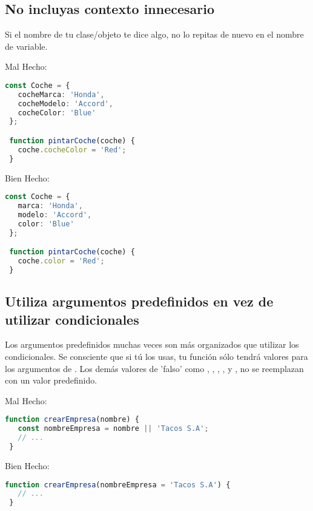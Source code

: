 \newpage

\subsection*{No incluyas contexto innecesario}

Si el nombre de tu clase/objeto te dice algo, no lo repitas de nuevo en el nombre de variable.

Mal Hecho:
\begin{lstlisting}[language=TypeScript, style=badstyle]
 const Coche = {
   cocheMarca: 'Honda',
   cocheModelo: 'Accord',
   cocheColor: 'Blue'
 };

 function pintarCoche(coche) {
   coche.cocheColor = 'Red';
 }
\end{lstlisting}
\vspace{0.5cm} %

Bien Hecho:
\begin{lstlisting}[language=TypeScript, style=goodstyle]
 const Coche = {
   marca: 'Honda',
   modelo: 'Accord',
   color: 'Blue'
 };

 function pintarCoche(coche) {
   coche.color = 'Red';
 }
\end{lstlisting}

\subsection*{Utiliza argumentos predefinidos en vez de utilizar condicionales}

Los argumentos predefinidos muchas veces son más organizados que utilizar los condicionales. Se consciente que si tú los usas, tu función sólo tendrá valores para los argumentos de . Los demás valores de 'falso' como \lineCode{\textquotesingle\textquotesingle}, \lineCode{\textquotedblright\textquotedblright}, , ,  y , no se reemplazan con un valor predefinido.

Mal Hecho:
\begin{lstlisting}[language=TypeScript, style=badstyle]
 function crearEmpresa(nombre) {
   const nombreEmpresa = nombre || 'Tacos S.A';
   // ...
 }
\end{lstlisting}
\vspace{0.5cm} %

Bien Hecho:
\begin{lstlisting}[language=TypeScript, style=goodstyle]
 function crearEmpresa(nombreEmpresa = 'Tacos S.A') {
   // ...
 }
\end{lstlisting}
